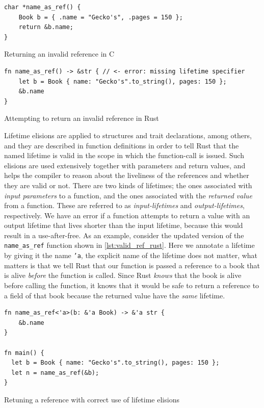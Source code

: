 \begin{listing}[tb]
\begin{verbatim}
char *name_as_ref() {
    Book b = { .name = "Gecko's", .pages = 150 };
    return &b.name;
}
\end{verbatim}
\caption{Returning an invalid reference in C}
\label{lst:invalid_ref_c}
\end{listing}

\begin{listing}[tb]
\begin{verbatim}
fn name_as_ref() -> &str { // <- error: missing lifetime specifier
    let b = Book { name: "Gecko's".to_string(), pages: 150 };
    &b.name
}
\end{verbatim}
\caption{Attempting to return an invalid reference in Rust}
\label{lst:invalid_ref_rust}
\end{listing}

Lifetime elisions are applied to structures and trait declarations, among others, and they are described in function definitions in order to tell Rust that the named lifetime is valid in the scope in which the function-call is issued.
Such elisions are used extensively together with parameters and return values, and helps the compiler to reason about the liveliness of the references and whether they are valid or not.
There are two kinds of lifetimes; the ones associated with \emph{input parameters} to a function, and the ones associated with the \emph{returned value} from a function.
These are referred to as \emph{input-lifetimes} and \emph{output-lifetimes}, respectively.
We have an error if a function attempts to return a value with an output lifetime that lives shorter than the input lifetime, because this would result in a use-after-free.
As an example, consider the updated version of the \texttt{name\_as\_ref} function shown in \autoref{lst:valid_ref_rust}.
Here we annotate a lifetime by giving it the name \texttt{'a}, the explicit name of the lifetime does not matter, what matters is that we tell Rust that our function is passed a reference to a book that is alive \emph{before} the function is called.
Since Rust \emph{knows} that the book is alive before calling the function, it knows that it would be safe to return a reference to a field of that book because the returned value have the \emph{same} lifetime.

\begin{listing}[tb]
\begin{verbatim}
fn name_as_ref<'a>(b: &'a Book) -> &'a str {
    &b.name
}

fn main() {
  let b = Book { name: "Gecko's".to_string(), pages: 150 };
  let n = name_as_ref(&b);
}
\end{verbatim}
\caption{Retuning a reference with correct use of lifetime elisions}
\label{lst:valid_ref_rust}
\end{listing}

